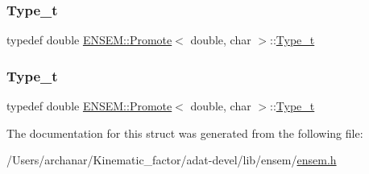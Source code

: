 \mbox{\label{structENSEM_1_1Promote_3_01double_00_01char_01_4_aa50bd72d8e60a859d481548688596791}} 
\subsubsection{\texorpdfstring{Type\_t}{Type\_t}\hspace{0.1cm}{\footnotesize\ttfamily [2/3]}}
{\footnotesize\ttfamily typedef double \mbox{\hyperlink{structENSEM_1_1Promote}{E\+N\+S\+E\+M\+::\+Promote}}$<$ double, char $>$\+::\mbox{\hyperlink{structENSEM_1_1Promote_3_01double_00_01char_01_4_aa50bd72d8e60a859d481548688596791}{Type\+\_\+t}}}

\mbox{\label{structENSEM_1_1Promote_3_01double_00_01char_01_4_aa50bd72d8e60a859d481548688596791}} 
\subsubsection{\texorpdfstring{Type\_t}{Type\_t}\hspace{0.1cm}{\footnotesize\ttfamily [3/3]}}
{\footnotesize\ttfamily typedef double \mbox{\hyperlink{structENSEM_1_1Promote}{E\+N\+S\+E\+M\+::\+Promote}}$<$ double, char $>$\+::\mbox{\hyperlink{structENSEM_1_1Promote_3_01double_00_01char_01_4_aa50bd72d8e60a859d481548688596791}{Type\+\_\+t}}}



The documentation for this struct was generated from the following file\+:\begin{DoxyCompactItemize}
\item 
/\+Users/archanar/\+Kinematic\+\_\+factor/adat-\/devel/lib/ensem/\mbox{\hyperlink{adat-devel_2lib_2ensem_2ensem_8h}{ensem.\+h}}\end{DoxyCompactItemize}
